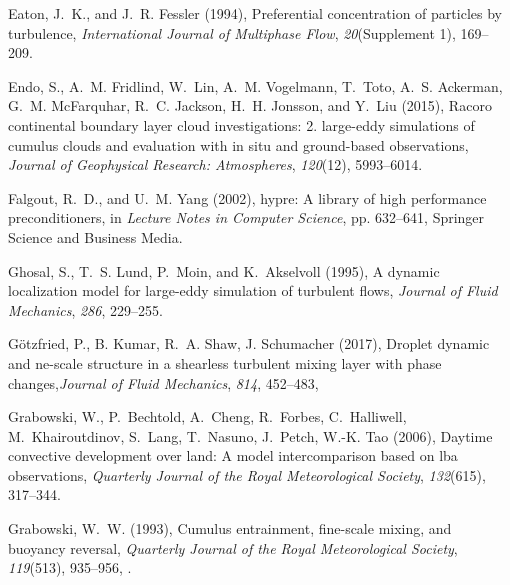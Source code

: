 \documentclass[draft,linenumbers]{agujournal}
\begin{document}
\begin{thebibliography}{60}
Eaton, J.~K., and J.~R. Fessler (1994), Preferential concentration of particles
  by turbulence, \textit{International Journal of Multiphase Flow},
  \textit{20}(Supplement 1), 169--209.

Endo, S., A.~M. Fridlind, W.~Lin, A.~M. Vogelmann, T.~Toto, A.~S. Ackerman,
  G.~M. McFarquhar, R.~C. Jackson, H.~H. Jonsson, and Y.~Liu (2015), Racoro
  continental boundary layer cloud investigations: 2. large-eddy simulations of
  cumulus clouds and evaluation with in situ and ground-based observations,
  \textit{Journal of Geophysical Research: Atmospheres}, \textit{120}(12),
  5993--6014.

Falgout, R.~D., and U.~M. Yang (2002), hypre: A library of high performance
  preconditioners, in \textit{Lecture Notes in Computer Science}, pp. 632--641,
  Springer Science and Business Media.

Ghosal, S., T.~S. Lund, P.~Moin, and K.~Akselvoll (1995), A dynamic
  localization model for large-eddy simulation of turbulent flows,
  \textit{Journal of Fluid Mechanics}, \textit{286}, 229--255.

G\"{o}tzfried, P., B. Kumar, R.~A. Shaw, J. Schumacher (2017), Droplet dynamic and ne-scale structure in a shearless turbulent mixing layer with phase changes,\textit{Journal of Fluid Mechanics}, \textit{814}, 452--483, 
  
Grabowski, W., P.~Bechtold, A.~Cheng, R.~Forbes, C.~Halliwell,
  M.~Khairoutdinov, S.~Lang, T.~Nasuno, J.~Petch, W.-K. Tao (2006),
  Daytime convective development over land: A model intercomparison based on
  lba observations, \textit{Quarterly Journal of the Royal Meteorological
  Society}, \textit{132}(615), 317--344.

Grabowski, W.~W. (1993), Cumulus entrainment, fine-scale mixing, and buoyancy
  reversal, \textit{Quarterly Journal of the Royal Meteorological Society},
  \textit{119}(513), 935--956, .


\end{thebibliography}
\end{document}
